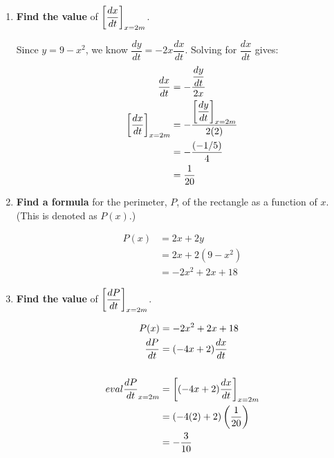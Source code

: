 \documentclass{ximera}
\begin{document}
\begin{problem}
\begin{enumerate}
\begin{explanation}
					The height of the rectangle is the $y$-coordinate of the point in the
					 upper-right corner. Since this point lies on the graph of $f(x)=9-x^2$, 
					 we know $y = 9-x^2$.
				\end{explanation}


			\item\label{SpartB} \textbf{Find the value} of $\displaystyle \bigg[ \dfrac{dx}{dt} \bigg]_{x=2 m}$.

\begin{explanation}
					Since $y = 9-x^2$, we know $\displaystyle \dfrac{dy}{dt} = -2x \dfrac{dx}{dt}$.
					Solving for $\dfrac{dx}{dt}$ gives:
					\begin{align*}
						\dfrac{dx}{dt} &= -\dfrac{ \dfrac{dy}{dt} }{2x} \\
					\bigg[ \dfrac{dx}{dt} \bigg]_{x=2 m} &= -\dfrac{ \bigg[ \dfrac{dy}{dt} \bigg]_{x=2 m} }{2(2)} \\
						&= -\dfrac{ (-1/5) }{4} \\
						&= \dfrac{ 1 }{20}
					\end{align*}
				\end{explanation}

				
			\item\label{SpartC} \textbf{Find a formula} for the perimeter, $P$, of the rectangle as a function of $x$. (This is denoted as $P(x)$.)\\[1em]
\begin{explanation}
					\begin{align*}
						P(x) &= 2x + 2y \\
						&= 2x + 2( 9-x^2)\\
						&= -2x^2 + 2x + 18
					\end{align*}
				\end{explanation}			


			\item\label{SpartD} \textbf{Find the value} of $\displaystyle \bigg[ \dfrac{dP}{dt} \bigg]_{x=2 m}$.
\begin{explanation}
					\begin{align*}
						P(x) &= -2x^2 + 2x + 18\\
						\dfrac{dP}{dt} &= (-4x+2) \dfrac{dx}{dt} \\
						\\eval{\dfrac{dP}{dt}}_{x=2 m} &= \bigg[ (-4x+2) \dfrac{dx}{dt} \bigg]_{x=2 m} \\
							&= (-4(2)+2) \left(\dfrac{ 1 }{20}\right)\\
							&= -\dfrac{3}{10}
					\end{align*}
				\end{explanation}						
			

\end{enumerate}
\end{problem}
\end{document}
